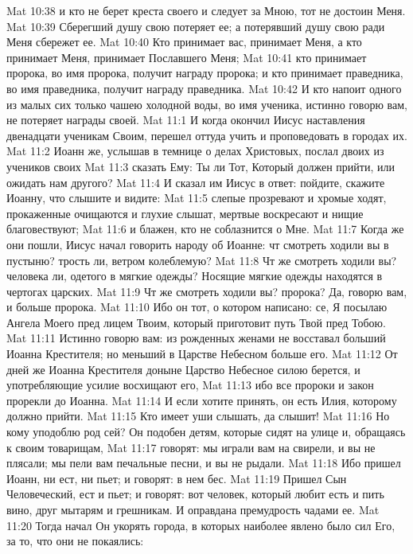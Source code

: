 \vs Mat 10:38 и кто не берет креста своего и следует за Мною, тот не достоин Меня.
\vs Mat 10:39 Сберегший душу свою потеряет ее; а потерявший душу свою ради Меня сбережет ее.
\vs Mat 10:40 Кто принимает вас, принимает Меня, а кто принимает Меня, принимает Пославшего Меня;
\vs Mat 10:41 кто принимает пророка, во имя пророка, получит награду пророка; и кто принимает праведника, во имя праведника, получит награду праведника.
\vs Mat 10:42 И кто напоит одного из малых сих только чашею холодной воды, во имя ученика, истинно говорю вам, не потеряет награды своей.
\vs Mat 11:1 И когда окончил Иисус наставления двенадцати ученикам Своим, перешел оттуда учить и проповедовать в городах их.
\vs Mat 11:2 Иоанн же, услышав в темнице о делах Христовых, послал двоих из учеников своих
\vs Mat 11:3 сказать Ему: Ты ли Тот, Который должен прийти, или ожидать нам другого?
\vs Mat 11:4 И сказал им Иисус в ответ: пойдите, скажите Иоанну, что слышите и видите:
\vs Mat 11:5 слепые прозревают и хромые ходят, прокаженные очищаются и глухие слышат, мертвые воскресают и нищие благовествуют;
\vs Mat 11:6 и блажен, кто не соблазнится о Мне.
\rsbpar\vs Mat 11:7 Когда же они пошли, Иисус начал говорить народу об Иоанне: чт смотреть ходили вы в пустыню? трость ли, ветром колеблемую?
\vs Mat 11:8 Чт же смотреть ходили вы? человека ли, одетого в мягкие одежды? Носящие мягкие одежды находятся в чертогах царских.
\vs Mat 11:9 Чт же смотреть ходили вы? пророка? Да, говорю вам, и больше пророка.
\vs Mat 11:10 Ибо он тот, о котором написано: се, Я посылаю Ангела Моего пред лицем Твоим, который приготовит путь Твой пред Тобою.
\vs Mat 11:11 Истинно говорю вам: из рожденных женами не восставал больший Иоанна Крестителя; но меньший в Царстве Небесном больше его.
\vs Mat 11:12 От дней же Иоанна Крестителя доныне Царство Небесное силою берется, и употребляющие усилие восхищают его,
\vs Mat 11:13 ибо все пророки и закон прорекли до Иоанна.
\vs Mat 11:14 И если хотите принять, он есть Илия, которому должно прийти.
\vs Mat 11:15 Кто имеет уши слышать, да слышит!
\vs Mat 11:16 Но кому уподоблю род сей? Он подобен детям, которые сидят на улице и, обращаясь к своим товарищам,
\vs Mat 11:17 говорят: мы играли вам на свирели, и вы не плясали; мы пели вам печальные песни, и вы не рыдали.
\vs Mat 11:18 Ибо пришел Иоанн, ни ест, ни пьет; и говорят: в нем бес.
\vs Mat 11:19 Пришел Сын Человеческий, ест и пьет; и говорят: вот человек, который любит есть и пить вино, друг мытарям и грешникам. И оправдана премудрость чадами ее.
\rsbpar\vs Mat 11:20 Тогда начал Он укорять города, в которых наиболее явлено было сил Его, за то, что они не покаялись:
